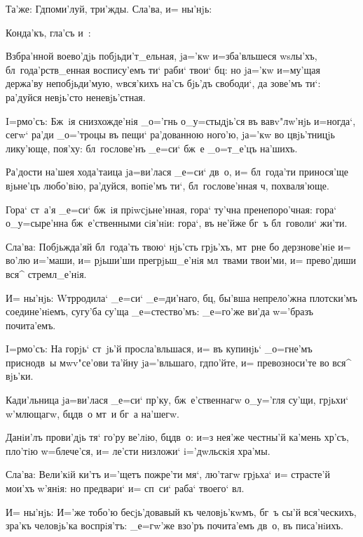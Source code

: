 Та'же: Гд поми'луй, три'жды. Сла'ва, и= ны'нjь:

Конда'къ, гла'съ и~:

Взбра'нной воево'дjь побjьди'т_ельная, jа='кw 
и=зба'вльшеся w\т sлы'хъ, бл~года'рств_енная воспису'емъ 
ти` раби` твои` бц: но jа='кw и=му'щая держа'ву 
непобjьди'мую, w\т вся'кихъ на'съ бjь'дъ свободи`, да 
зове'мъ ти`: ра'дуйся невjь'сто неневjь'стная.


I=рмо'съ: Бж~iя снизхожде'нiя _о='гнь о_у=стыдjь'ся въ 
вавv"лw'нjь и=ногда`, сегw` ра'ди _о='троцы въ пещи` 
ра'дованною ного'ю, jа='кw во цвjь'тницjь лику'юще, 
поя'ху: бл~гослове'нъ _е=си` бж~е _о=т_е'цъ на'шихъ.

Ра'дости на'шея хода'таица jа=ви'лася _е=си` дв~о, и= 
бл~года'ти принося'ще вjьне'цъ любо'вiю, ра'дуйся, 
вопiе'мъ ти`, бл~гослове'нная ч, похваля'юще.

Гора` ст~а'я _е=си` бж~iя прiwсjьне'нная, гора` ту'чна 
пренепоро'чная: гора` о_у=сыре'нна бж~е'ственными 
сiя'нiи: гора`, въ не'йже бг~ъ бл~говоли` жи'ти.

Сла'ва: Побjьжда'яй бл~года'ть твою` нjь'сть грjь'хъ, 
мт~рне бо дерзнове'нiе и= во'лю и='маши, и= рjьши'ши 
прегрjьш_е'нiя мл~твами твои'ми, и= прево'диши вся^ 
стремл_е'нiя.

И= ны'нjь: W\т тр родила` _е=си` _е=ди'наго, 
бц, бы'вша непрело'жна плотски'мъ соедине'нiемъ, 
сугу'ба су'ща _е=стество'мъ: _е=го'же ви'да w='бразъ 
почита'емъ.


I=рмо'съ: На горjь` ст~jь'й просла'вльшася, и= въ 
купинjь` _о=гне'мъ приснодв~ы мwv"се'ови та'йну 
jа='вльшаго, гд по'йте, и= превозноси'те во вся^ 
вjь'ки.

Кади'льница jа=ви'лася _е=си` пр'ку, 
бж~е'ственнагw о_у='гля су'щи, грjьхи` w'млющагw, 
бц дв~о мт~и бг~а на'шегw.

Данiи'лъ прови'дjь тя` го'ру ве'лiю, бц дв~о: и=з\ъ 
нея'же честны'й ка'мень хр'съ, пло'тiю w=блече'ся, и= 
ле'сти низложи` i='дwльскiя хра'мы.

Сла'ва: Вели'кiй ки'тъ и='щетъ пожре'ти мя`, лю'тагw 
грjьха` и= страсте'й мои'хъ w'янiя: но предвари` и= 
сп~си` раба` твоего` вл.

И= ны'нjь: И='же тобо'ю бесjь'довавый къ человjь'кwмъ, 
бг~ъ сы'й вся'ческихъ, зра'къ человjь'ка воспрiя'тъ: 
_е=гw'же взо'ръ почита'емъ дв~о, въ писа'нiихъ.


